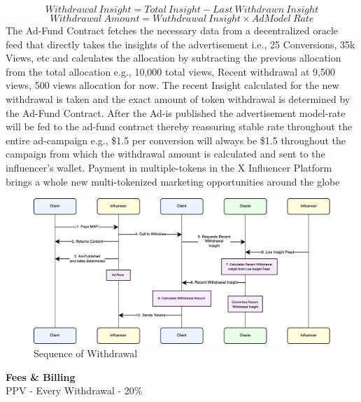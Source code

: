 \documentclass[letterpaper,11pt]{article}
\begin{document}
\[Withdrawal\:Insight=Total\:Insight-Last\:Withdrawn\:Insight\]
\[Withdrawal\:Amount=Wuthdrawal\:Insight \times AdModel\:Rate\]
The Ad-Fund Contract fetches the necessary data from a decentralized oracle feed that directly takes the insights of the advertisement i.e., 25 Conversions, 35k Views, etc and calculates the allocation by subtracting the previous allocation from the total allocation e.g., 10,000 total views, Recent withdrawal at 9,500 views, 500 views allocation for now. The recent Insight calculated for the new withdrawal is taken and the exact amount of token withdrawal is determined by the Ad-Fund Contract. After the Ad-is published the advertisement model-rate will be fed to the ad-fund contract thereby reassuring stable rate throughout the entire ad-campaign e.g., \$1.5 per conversion will always be \$1.5 throughout the campaign from which the withdrawal amount is calculated and sent to the influencer's wallet. Payment in multiple-tokens in the X Influencer Platform brings a whole new multi-tokenized marketing opportunities around the globe\\

\begin{figure}
\begin{center}
\includegraphics[width=12cm]{periodic-allocation-2}
\caption{Sequence of Withdrawal}
\end{center}
\end{figure}

\textbf{Fees \& Billing}\\

PPV - Every Withdrawal - 20\%\\
\end{document}
